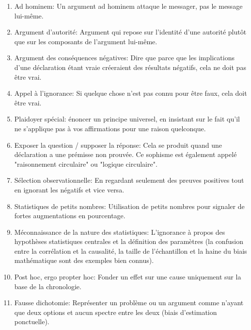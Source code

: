 	\begin{enumerate}
		\item Ad hominem: Un argument ad hominem attaque le messager, pas le message lui-même.

		\item Argument d'autorité: Argument qui repose sur l'identité d'une autorité plutôt que sur les composants de l'argument lui-même.

		\item Argument des conséquences négatives: Dire que parce que les implications d'une déclaration étant vraie créeraient des résultats négatifs, cela ne doit pas être vrai.

		\item Appel à l'ignorance: Si quelque chose n'est pas connu pour être faux, cela doit être vrai.

		\item Plaidoyer spécial: énoncer un principe universel, en insistant sur le fait qu'il ne s'applique pas à vos affirmations pour une raison quelconque.

		\item Exposer la question / supposer la réponse: Cela se produit quand une déclaration a une prémisse non prouvée. Ce sophisme est également appelé "raisonnement circulaire" ou "logique circulaire".

		\item Sélection observationnelle: En regardant seulement des preuves positives tout en ignorant les négatifs et vice versa.

		\item Statistiques de petits nombres: Utilisation de petits nombres pour signaler de fortes augmentations en pourcentage.

		\item Méconnaissance de la nature des statistiques: L'ignorance à propos des hypothèses statistiques centrales et la définition des paramètres (la confusion entre la corrélation et la causalité, la taille de l'échantillon et la haine du biais mathématique sont des exemples bien connus).

		\item Post hoc, ergo propter hoc: Fonder un effet sur une cause uniquement sur la base de la chronologie.

		\item Fausse dichotomie: Représenter un problème ou un argument comme n'ayant que deux options et aucun spectre entre les deux (biais d'estimation ponctuelle).


\end{enumerate}
